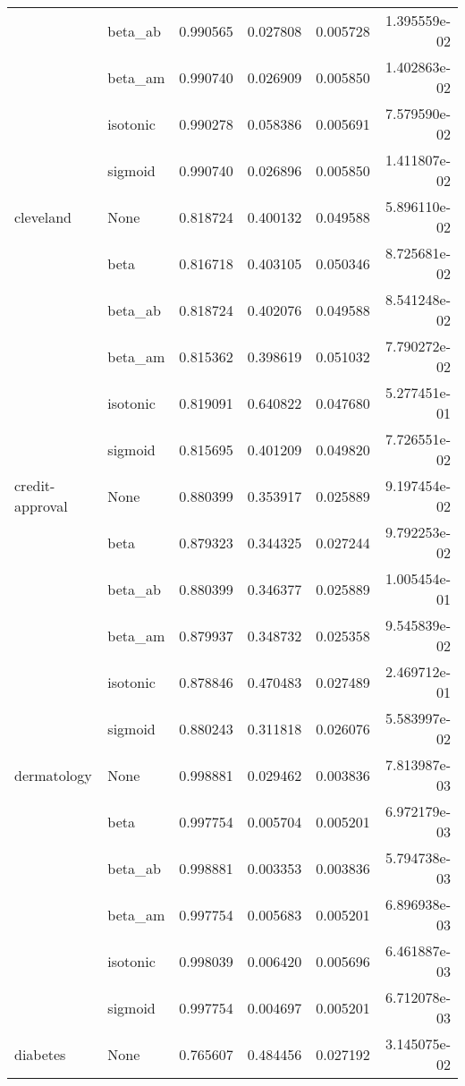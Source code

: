 \begin{tabular}{llrrrr}
        & beta\_ab &  0.990565 &  0.027808 &  0.005728 &  1.395559e-02 \\
        & beta\_am &  0.990740 &  0.026909 &  0.005850 &  1.402863e-02 \\
        & isotonic &  0.990278 &  0.058386 &  0.005691 &  7.579590e-02 \\
        & sigmoid &  0.990740 &  0.026896 &  0.005850 &  1.411807e-02 \\
cleveland & None &  0.818724 &  0.400132 &  0.049588 &  5.896110e-02 \\
        & beta &  0.816718 &  0.403105 &  0.050346 &  8.725681e-02 \\
        & beta\_ab &  0.818724 &  0.402076 &  0.049588 &  8.541248e-02 \\
        & beta\_am &  0.815362 &  0.398619 &  0.051032 &  7.790272e-02 \\
        & isotonic &  0.819091 &  0.640822 &  0.047680 &  5.277451e-01 \\
        & sigmoid &  0.815695 &  0.401209 &  0.049820 &  7.726551e-02 \\
credit-approval & None &  0.880399 &  0.353917 &  0.025889 &  9.197454e-02 \\
        & beta &  0.879323 &  0.344325 &  0.027244 &  9.792253e-02 \\
        & beta\_ab &  0.880399 &  0.346377 &  0.025889 &  1.005454e-01 \\
        & beta\_am &  0.879937 &  0.348732 &  0.025358 &  9.545839e-02 \\
        & isotonic &  0.878846 &  0.470483 &  0.027489 &  2.469712e-01 \\
        & sigmoid &  0.880243 &  0.311818 &  0.026076 &  5.583997e-02 \\
dermatology & None &  0.998881 &  0.029462 &  0.003836 &  7.813987e-03 \\
        & beta &  0.997754 &  0.005704 &  0.005201 &  6.972179e-03 \\
        & beta\_ab &  0.998881 &  0.003353 &  0.003836 &  5.794738e-03 \\
        & beta\_am &  0.997754 &  0.005683 &  0.005201 &  6.896938e-03 \\
        & isotonic &  0.998039 &  0.006420 &  0.005696 &  6.461887e-03 \\
        & sigmoid &  0.997754 &  0.004697 &  0.005201 &  6.712078e-03 \\
diabetes & None &  0.765607 &  0.484456 &  0.027192 &  3.145075e-02 \\

\end{tabular}
